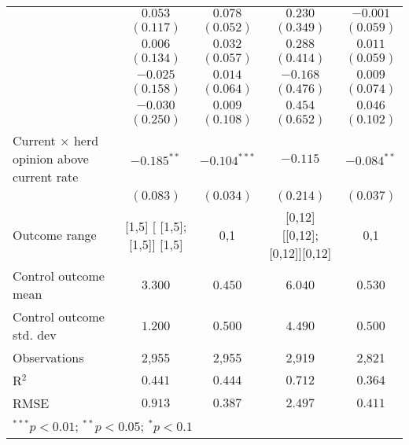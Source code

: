 \begin{table}
\begin{center}
\begin{tabular}{l c c c c}
                                                 & $0.053$                      & $0.078$        & $0.230$                       & $-0.001$       \\
                                                 & $(0.117)$                    & $(0.052)$      & $(0.349)$                     & $(0.059)$      \\
                                                 & $0.006$                      & $0.032$        & $0.288$                       & $0.011$        \\
                                                 & $(0.134)$                    & $(0.057)$      & $(0.414)$                     & $(0.059)$      \\
                                                 & $-0.025$                     & $0.014$        & $-0.168$                      & $0.009$        \\
                                                 & $(0.158)$                    & $(0.064)$      & $(0.476)$                     & $(0.074)$      \\
                                                 & $-0.030$                     & $0.009$        & $0.454$                       & $0.046$        \\
                                                 & $(0.250)$                    & $(0.108)$      & $(0.652)$                     & $(0.102)$      \\
Current $\times$ herd opinion above current rate & $-0.185^{**}$                & $-0.104^{***}$ & $-0.115$                      & $-0.084^{**}$  \\
                                                 & $(0.083)$                    & $(0.034)$      & $(0.214)$                     & $(0.037)$      \\
\hline
Outcome range                                    & [1,5] [ [1,5];  [1,5]] [1,5] & {0,1}          & [0,12] [[0,12]; [0,12]][0,12] & {0,1}          \\
Control outcome mean                             & $3.300$                      & $0.450$        & $6.040$                       & $0.530$        \\
Control outcome std. dev                         & $1.200$                      & $0.500$        & $4.490$                       & $0.500$        \\
Observations                                     & 2,955                        & 2,955          & 2,919                         & 2,821          \\
R$^{2}$                                          & $0.441$                      & $0.444$        & $0.712$                       & $0.364$        \\
RMSE                                             & $0.913$                      & $0.387$        & $2.497$                       & $0.411$        \\
\hline
\multicolumn{5}{l}{\scriptsize{$^{***}p<0.01$; $^{**}p<0.05$; $^{*}p<0.1$}}
\end{tabular}
\caption{}
\label{table:SI_table5_currentherdint}
\end{center}
\end{table}
